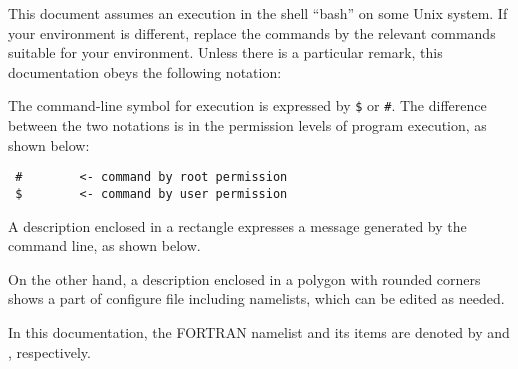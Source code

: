 
This document assumes an execution in the shell ``bash'' on some Unix system.
If your environment is different, replace the commands
by the relevant commands suitable for your environment.
Unless there is a particular remark, this documentation obeys the following notation:

The command-line symbol for execution is expressed by \verb|$| or \verb|#|.
The difference between the two notations is
in the permission levels of program execution, as shown below:
\begin{verbatim}
 #        <- command by root permission
 $        <- command by user permission
\end{verbatim}

A description enclosed in a rectangle expresses a message generated by the command line, as shown below.

On the other hand, a description enclosed in a polygon with rounded corners shows a part of configure file including namelists, which can be edited as needed.

In this documentation, the FORTRAN namelist and its items are denoted by
 and , respectively.

